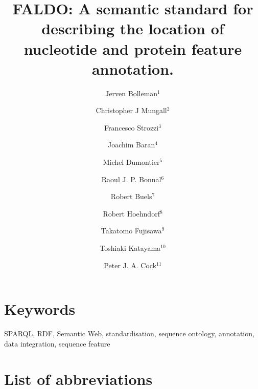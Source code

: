 \documentclass[10pt]{bmc_article}
\newenvironment{bmcformat}{\begin{raggedright}\baselineskip20pt\sloppy\setboolean{publ}{false}}{\end{raggedright}\baselineskip20pt\sloppy}
\begin{document}
\begin{bmcformat}
\title{FALDO: A semantic standard for describing the location of nucleotide and protein feature annotation.}
\author{Jerven Bolleman\correspondingauthor$^{1}$%
    \and Christopher J Mungall$^{2}$%
    \and Francesco Strozzi$^{3}$%
    \and Joachim Baran$^{4}$%
    \and Michel Dumontier$^{5}$%
    \and Raoul J. P. Bonnal$^{6}$%
    \and Robert Buels$^{7}$%
    \and Robert Hoehndorf$^{8}$%
    \and Takatomo Fujisawa$^{9}$%
    \and Toshiaki Katayama$^{10}$%
    \and Peter J. A. Cock$^{11}$%
%
}
\address{
 \iid(1) SIB Swiss Institute of Bioinformatics, Centre Medical Universitaire, 1 rue Michel
Servet, 1211 Geneva 4, Switzerland,
 \iid(2) Genomics Division, Lawrence Berkeley National Laboratory, Berkeley, CA, 94720, US,
 \iid(3) CeRSA, Parco Tecnologico Padano, Lodi 26900, Italy,
 \iid(4) Ontario Institute for Cancer Research, 101 College Street, Suite 800, Toronto, Ontario, M5G 0A3, Canada,
 \iid(5) Stanford Center for Biomedical Informatics Research, 1265 Welch Road, Room X223, Stanford, CA, 94305-5479, US,
 \iid(6) Integrative Biology Program, Istituto Nazionale Genetica Molecolare, Milan, Italy,
 \iid(7) University of California, Berkeley, Berkeley, CA, USA,
 \iid(8) Department of Computer Science, Aberystwyth, SY23 3DB, UK,
 \iid(9) Center for Information Biology, National Institute of Genetics, Research Organization of Information and Systems, 1111 Yata, Mishima, Shizuoka 411-08540, Japan,
 \iid(10) Database Center for Life Science, Research Organization of Information and Systems, 2-11-16, Yayoi, Bunkyo-ku, Tokyo, 113-0032, Japan, and
 \iid(11) The James Hutton Institute, Dundee, DD2 5DA, UK.
}
\maketitle


\section*{Keywords}
SPARQL, RDF, Semantic Web, standardisation, sequence ontology, annotation, data integration, sequence feature









\section*{List of abbreviations}


\end{bmcformat}
\end{document}
